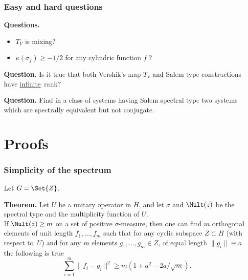 \begin{frame}
  \frametitle{Easy and hard questions}
  
  {\bf Questions.} 
  \begin{itemize}
   \item $T_V$ is mixing? 
   \item $\kappa(\sigma_f) \ge -1/2$ for any cylindric function $f \;$?
  \end{itemize}
  
  \bigskip
  {\bf Question.} 
  Is it true that both Vershik's map $T_V$ and Salem-type constructions have \underline{infinite}\ rank? 
  
  \bigskip
  {\bf Question.} 
  Find in a class of systems having Salem spectral type 
  two systems which are spectrally equivalent but not conjugate.  
  
  
  
\end{frame}


\section{Proofs}

\begin{frame}
  \frametitle{Simplicity of the spectrum}

  Let $G = \Set{Z}$. 
  
  \bigskip
  {\bf Theorem.} Let $U$ be a unitary operator in $H$, and let $\sigma$ and $\Mult(z)$ 
  be the spectral type and the multiplicity function of $U$. 
  \\ 
  If $\Mult(z) \ge m$ on a set of positive $\sigma$-measure, then   
  one can find $m$ orthogonal elements of unit length $f_1,\dots,f_m$ such that 
  for any cyclic subspace ${Z \subset H}$ (with respect to~$U$) and for any 
  $m$ elements $g_1,\dots,g_m \in Z$, of equal length ${\|g_i\| \equiv a}$ 
  the following is true 
\begin{equation}\label{eSpMultEst} 
    \sum_{i=1}^m \|f_i - g_i\|^2 \ge m (1 + a^2 - 2a/\sqrt{m}). 
	\tag{$*$}
\end{equation}
    
\end{frame}




